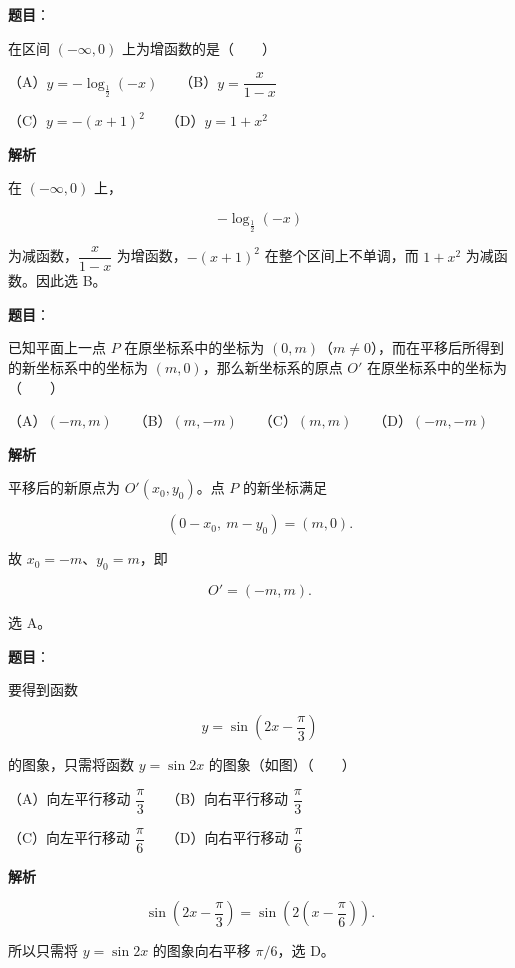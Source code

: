 \begin{answer}

\textbf{题目}：

在区间 $(-\infty,0)$ 上为增函数的是\mbox{（　　）}

（A）$y=-\log_{\frac12}(-x)$　　（B）$y=\dfrac{x}{1-x}$

（C）$y=-(x+1)^2$　　（D）$y=1+x^2$

\textbf{解析}

在 $(-\infty,0)$ 上，

\nopagebreak[4]
\[
-\log_{\frac12}(-x)
\]

为减函数，$\dfrac{x}{1-x}$ 为增函数，$-(x+1)^2$ 在整个区间上不单调，而 $1+x^2$ 为减函数。因此选 B。


\end{answer}
\begin{answer}

\textbf{题目}：

已知平面上一点 $P$ 在原坐标系中的坐标为 $(0,m)$（$m\ne0$），而在平移后所得到的新坐标系中的坐标为 $(m,0)$，那么新坐标系的原点 $O'$ 在原坐标系中的坐标为\mbox{（　　）}

（A）$(-m,m)$　　（B）$(m,-m)$　　（C）$(m,m)$　　（D）$(-m,-m)$

\textbf{解析}

平移后的新原点为 $O'(x_0,y_0)$。点 $P$ 的新坐标满足

\nopagebreak[4]
\[
(0-x_0,\ m-y_0)=(m,0).
\]

故 $x_0=-m$、$y_0=m$，即

\nopagebreak[4]
\[
O'=(-m,m).
\]

选 A。


\end{answer}
\begin{answer}

\textbf{题目}：

要得到函数

\nopagebreak[4]
\[
y=\sin\left(2x-\frac\pi3\right)
\]

的图象，只需将函数 $y=\sin2x$ 的图象（如图）\mbox{（　　）}
\nopagebreak[4]
\begin{center}\end{center}
\nopagebreak[4]
（A）向左平行移动 $\dfrac\pi3$　　（B）向右平行移动 $\dfrac\pi3$

（C）向左平行移动 $\dfrac\pi6$　　（D）向右平行移动 $\dfrac\pi6$

\textbf{解析}

\nopagebreak[4]
\[
\sin\left(2x-\frac\pi3\right)
=\sin\left(2\left(x-\frac\pi6\right)\right).
\]

所以只需将 $y=\sin2x$ 的图象向右平移 $\pi/6$，选 D。


\end{answer}
